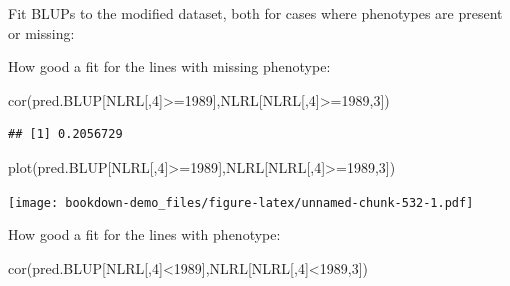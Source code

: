 \documentclass[
]{book}
\newenvironment{Shaded}{\begin{snugshade}}{\end{snugshade}}
\newcommand{\AttributeTok}[1]{\textcolor[rgb]{0.77,0.63,0.00}{#1}}
\newcommand{\DecValTok}[1]{\textcolor[rgb]{0.00,0.00,0.81}{#1}}
\newcommand{\FunctionTok}[1]{\textcolor[rgb]{0.00,0.00,0.00}{#1}}
\newcommand{\NormalTok}[1]{#1}
\newcommand{\OtherTok}[1]{\textcolor[rgb]{0.56,0.35,0.01}{#1}}
\newcommand{\SpecialCharTok}[1]{\textcolor[rgb]{0.00,0.00,0.00}{#1}}
\begin{document}
Fit BLUPs to the modified dataset, both for cases where phenotypes are present or missing:

\begin{Shaded}
\end{Shaded}

How good a fit for the lines with missing phenotype:

\begin{Shaded}
\begin{Highlighting}[]
\FunctionTok{cor}\NormalTok{(pred.BLUP[NLRL[,}\DecValTok{4}\NormalTok{]}\SpecialCharTok{\textgreater{}=}\DecValTok{1989}\NormalTok{],NLRL[NLRL[,}\DecValTok{4}\NormalTok{]}\SpecialCharTok{\textgreater{}=}\DecValTok{1989}\NormalTok{,}\DecValTok{3}\NormalTok{])}
\end{Highlighting}
\end{Shaded}

\begin{verbatim}
## [1] 0.2056729
\end{verbatim}

\begin{Shaded}
\begin{Highlighting}[]
\FunctionTok{plot}\NormalTok{(pred.BLUP[NLRL[,}\DecValTok{4}\NormalTok{]}\SpecialCharTok{\textgreater{}=}\DecValTok{1989}\NormalTok{],NLRL[NLRL[,}\DecValTok{4}\NormalTok{]}\SpecialCharTok{\textgreater{}=}\DecValTok{1989}\NormalTok{,}\DecValTok{3}\NormalTok{])}
\end{Highlighting}
\end{Shaded}

\texttt{[image: bookdown-demo\_files/figure-latex/unnamed-chunk-532-1.pdf]}

How good a fit for the lines with phenotype:

\begin{Shaded}
\begin{Highlighting}[]
\FunctionTok{cor}\NormalTok{(pred.BLUP[NLRL[,}\DecValTok{4}\NormalTok{]}\SpecialCharTok{\textless{}}\DecValTok{1989}\NormalTok{],NLRL[NLRL[,}\DecValTok{4}\NormalTok{]}\SpecialCharTok{\textless{}}\DecValTok{1989}\NormalTok{,}\DecValTok{3}\NormalTok{])}
\end{Highlighting}
\end{Shaded}
\end{document}
